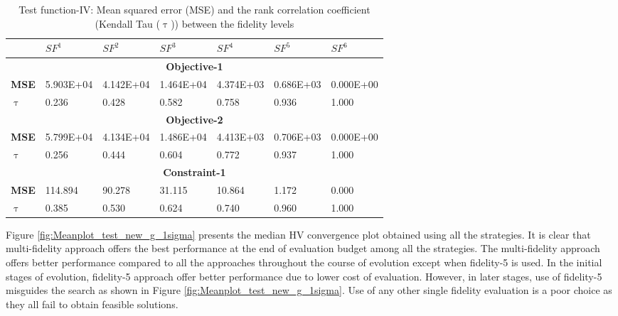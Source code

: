 \begin{table}[!htb]\footnotesize
	\centering
	\caption{Test function-IV: Mean squared error (MSE) and the rank correlation coefficient (Kendall Tau ($\uptau$)) between the fidelity levels}
	\label{table:mse_tau_test4}	
	\begin{tabular}{|l|l|l|l|l|l|l|}
		\noalign{\smallskip}\hline
		& \textbf{$SF^1$} & \textbf{$SF^2$} & \textbf{$SF^3$} & \textbf{$SF^4$} & \textbf{$SF^5$} & \textbf{$SF^6$} \\ \hline
		\multicolumn{7}{|c|}{\textbf{Objective-1}}                                                                                  \\ \hline
		\textbf{MSE}    & 5.903E+04       & 4.142E+04       & 1.464E+04       & 4.374E+03       & 0.686E+03       & 0.000E+00       \\ \hline
		\textbf{$\uptau$} & 0.236           & 0.428           & 0.582           & 0.758           & 0.936           & 1.000           \\ \hline
		\multicolumn{7}{|c|}{\textbf{Objective-2}}                                                                                  \\ \hline
		\textbf{MSE}    & 5.799E+04       & 4.134E+04       & 1.486E+04       & 4.413E+03       & 0.706E+03       & 0.000E+00       \\ \hline
		\textbf{$\uptau$} & 0.256           & 0.444           & 0.604           & 0.772           & 0.937           & 1.000           \\ \hline
		\multicolumn{7}{|c|}{\textbf{Constraint-1}}                                                                                 \\ \hline
		\textbf{MSE}    & 114.894         & 90.278          & 31.115          & 10.864          & 1.172           & 0.000           \\ \hline
		\textbf{$\uptau$} & 0.385           & 0.530           & 0.624           & 0.740           & 0.960           & 1.000           \\ \hline
	\end{tabular}
\end{table}

Figure \ref{fig:Meanplot_test_new_g_1sigma} presents the median HV convergence plot obtained using all the strategies. It is clear that multi-fidelity approach offers the best performance at the end of evaluation budget among all the strategies. The multi-fidelity approach offers better performance compared to all the approaches throughout the course of evolution except when fidelity-5 is used. In the initial stages of evolution, fidelity-5 approach offer better performance due to lower cost of evaluation. However, in later stages, use of fidelity-5 misguides the search as shown in Figure \ref{fig:Meanplot_test_new_g_1sigma}. Use of any other single fidelity evaluation is a poor choice as they all fail to obtain feasible solutions.

